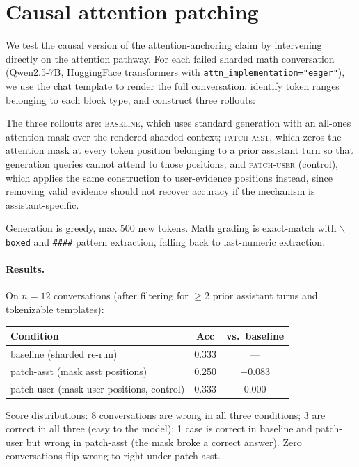 \documentclass{article}
\begin{document}
\section{Causal attention patching}
\label{app:attn-patch}

We test the causal version of the attention-anchoring claim by intervening directly on the attention pathway. For each failed sharded math conversation (Qwen2.5-7B, HuggingFace transformers with \texttt{attn\_implementation="eager"}), we use the chat template to render the full conversation, identify token ranges belonging to each block type, and construct three rollouts:

The three rollouts are: \textsc{baseline}, which uses standard generation with an all-ones attention mask over the rendered sharded context; \textsc{patch-asst}, which zeros the attention mask at every token position belonging to a prior assistant turn so that generation queries cannot attend to those positions; and \textsc{patch-user} (control), which applies the same construction to user-evidence positions instead, since removing valid evidence should not recover accuracy if the mechanism is assistant-specific.

Generation is greedy, max 500 new tokens. Math grading is exact-match with $\backslash\!$ \texttt{boxed} and \texttt{\#\#\#\#} pattern extraction, falling back to last-numeric extraction.

\paragraph{Results.}
On $n{=}12$ conversations (after filtering for $\geq 2$ prior assistant turns and tokenizable templates):

\begin{center}
\small
\begin{tabular}{lcc}
\toprule
Condition & Acc & vs.\ baseline \\
\midrule
baseline (sharded re-run) & 0.333 & --- \\
patch-asst (mask asst positions) & 0.250 & $-0.083$ \\
patch-user (mask user positions, control) & 0.333 & $0.000$ \\
\bottomrule
\end{tabular}
\end{center}

Score distributions: 8 conversations are wrong in all three conditions; 3 are correct in all three (easy to the model); 1 case is correct in baseline and patch-user but wrong in patch-asst (the mask broke a correct answer). Zero conversations flip wrong-to-right under patch-asst.
\end{document}
